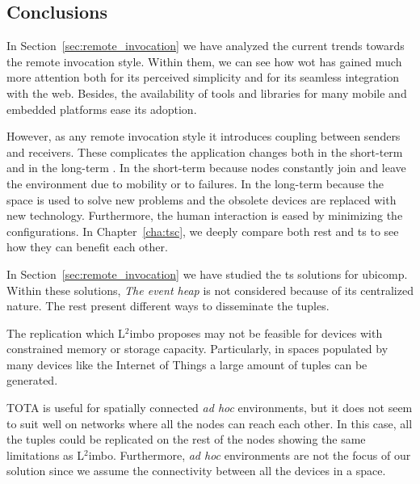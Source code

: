 \subsection{Conclusions} %


In Section~\ref{sec:remote_invocation} we have analyzed the current trends towards the remote invocation style.
Within them, we can see how \ac{wot} has gained much more attention both for its perceived simplicity and for its seamless integration with the web.
Besides, the availability of tools and libraries for many mobile and embedded platforms ease its adoption.


However, as any remote invocation style it introduces coupling between senders and receivers.
These complicates the application changes both in the short-term and in the long-term \citep{johanson_extending_2004}.
In the short-term because nodes constantly join and leave the environment due to mobility or to failures.
In the long-term because the space is used to solve new problems and the obsolete devices are replaced with new technology.
Furthermore, the human interaction is eased by minimizing the configurations.
In Chapter~\ref{cha:tsc}, we deeply compare both \ac{rest} and \ac{ts} to see how they can benefit each other.


\bigskip



In Section~\ref{sec:remote_invocation} we have studied the \ac{ts} solutions for \acl{ubicomp}.
Within these solutions, \emph{The event heap} is not considered because of its centralized nature.
The rest present different ways to disseminate the tuples. %

The replication which L$^2$imbo proposes may not be feasible for devices with constrained memory or storage capacity.
Particularly, in spaces populated by many devices like the Internet of Things a large amount of tuples can be generated.

TOTA is useful for spatially connected \emph{ad hoc} environments, but it does not seem to suit well on networks where all the nodes can reach each other.
In this case, all the tuples could be replicated on the rest of the nodes showing the same limitations as L$^2$imbo.
Furthermore, \emph{ad hoc} environments are not the focus of our solution since we assume the connectivity between all the devices in a space.


